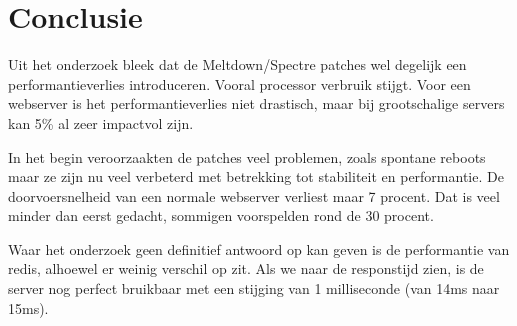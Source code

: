 
\chapter{Conclusie}
\label{ch:conclusie}



Uit het onderzoek bleek dat de Meltdown/Spectre patches wel degelijk een performantieverlies introduceren. Vooral processor verbruik stijgt. Voor een webserver is het performantieverlies niet drastisch, maar bij grootschalige servers kan 5\% al zeer impactvol zijn.

In het begin veroorzaakten de patches veel problemen, zoals spontane reboots maar ze zijn nu veel verbeterd met betrekking tot stabiliteit en performantie. De doorvoersnelheid van een normale webserver verliest maar 7 procent. Dat is veel minder dan eerst gedacht, sommigen voorspelden rond de 30 procent.



Waar het onderzoek geen definitief antwoord op kan geven is de performantie van redis, alhoewel er weinig verschil op zit. Als we naar de responstijd zien, is de server nog perfect bruikbaar met een stijging van 1 milliseconde (van 14ms naar 15ms).